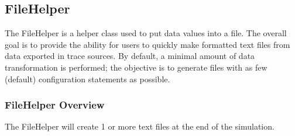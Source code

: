 \documentclass[letterpaper,10pt,english]{sphinxmanual}
\begin{document}
\begin{sphinxVerbatim}[commandchars=\\\{\}]
 

 

 
\end{sphinxVerbatim}


\subsection{FileHelper}
\label{\detokenize{data-collection-helpers:filehelper}}
The FileHelper is a helper class used to put data values into a file.
The overall goal is to provide the ability for users
to quickly make formatted text files from data exported in 
trace sources.  By default, a minimal amount of data transformation is
performed; the objective is to generate files with as few (default)
configuration statements as possible.


\subsubsection{FileHelper Overview}
\label{\detokenize{data-collection-helpers:filehelper-overview}}
The FileHelper will create 1 or more text files at the end of the
simulation.
\end{document}
